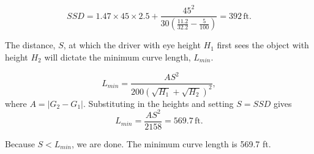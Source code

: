 \documentclass[12pt]{article}
\newcommand{\customsubsection}[1]{
  \subsection*{Problem \thesection.#1}
}
\begin{document}
\[
SSD = 1.47 \times 45 \times 2.5 + \frac{45^2}{30\left(\frac{11.2}{32.2} - \frac{5}{100}\right)} = 392 \, \text{ft}.
\]

The distance, $S$, at which the driver with eye height $H_1$ first sees the object with height $H_2$ will dictate the minimum curve length, $L_{min}$.

\[
L_{min} = \frac{AS^2}{200(\sqrt{H_1}+\sqrt{H_2})^2},
\]
where $A = |G_2 - G_1|$. Substituting in the heights and setting $S = SSD$ gives
\[
L_{min} = \frac{AS^2}{2158} = 569.7 \, \text{ft}.
\]

Because \(S < L_{min}\), we are done. The minimum curve length is 569.7 ft. 

\newpage

\end{document}
